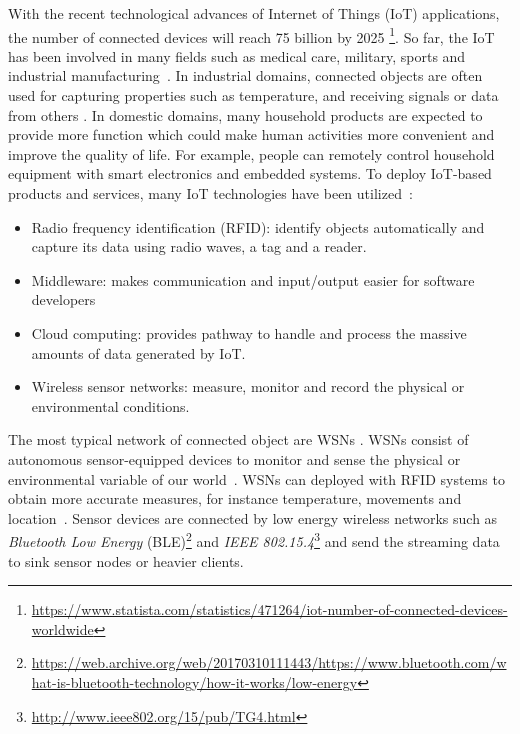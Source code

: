 With the recent technological advances of Internet of Things (IoT) applications,
the number of connected devices will reach 75 billion by 2025
\footnote{\url{https://www.statista.com/statistics/471264/iot-number-of-connected-devices-worldwide}}.
So far, the IoT has been involved in many fields such as medical care, military,
sports and industrial manufacturing~\cite{boudargham2017exhaustive,
lai2013survey, da2014internet}. In industrial domains, connected objects are
often used for capturing properties such as temperature, and receiving signals or
data from others . In domestic domains, many household products are expected to
provide more function which could make human activities more convenient and
improve the quality of life. For example, people can remotely control household
equipment with smart electronics and embedded systems.  To deploy IoT-based products
and services, many IoT technologies have been utilized~\cite{lee2015internet}:
\begin{itemize}
    \item Radio frequency identification (RFID): identify objects automatically
    and capture its data using radio waves, a tag and a reader.
    \item Middleware: makes communication and input/output easier for software
    developers
    \item Cloud computing: provides pathway to handle and process the massive
    amounts of data generated by IoT.
    \item Wireless sensor networks: measure, monitor and record the physical
    or environmental conditions.
\end{itemize}

The most typical network of connected object are WSNs . WSNs consist of
autonomous sensor-equipped devices to monitor and sense the physical or
environmental variable of our world~\cite{lee2015internet, li2016temporal}. WSNs
can deployed with RFID systems to obtain more accurate measures, for instance
temperature, movements and location~\cite{lee2015internet, atzori2010b}. Sensor
devices are connected by low energy wireless networks such as
\emph{Bluetooth Low Energy}
(BLE)\footnote{\url{https://web.archive.org/web/20170310111443/https://www.bluetooth.com/what-is-bluetooth-technology/how-it-works/low-energy}}
and \emph{IEEE 802.15.4}\footnote{\url{http://www.ieee802.org/15/pub/TG4.html}}
and send the streaming data to sink sensor nodes or heavier clients.

